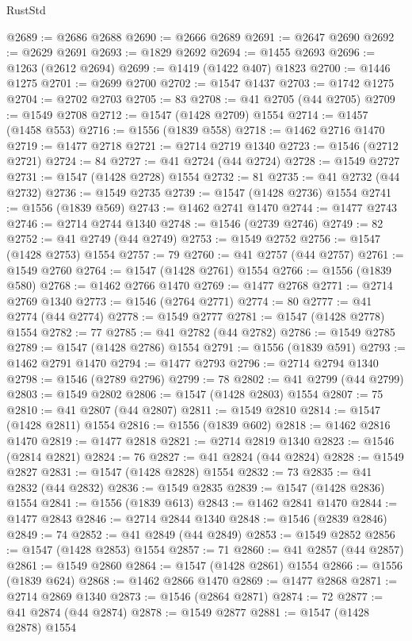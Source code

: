 \begin{lexlean}{RustStd}
\begin{coremodule}
{\begin{coremodule}
{{{{{{{{{{{{{{{{{{{{{{{{{{{{{{@2689 := @2686 @2688
@2690 := @2666 @2689
@2691 := @2647 @2690
@2692 := @2629 @2691
@2693 := @1829 @2692
@2694 := @1455 @2693
@2696 := @1263 (@2612 @2694)
@2699 := @1419 (@1422 @407) @1823
@2700 := @1446 @1275
@2701 := @2699 @2700
@2702 := @1547 @1437
@2703 := @1742 @1275
@2704 := @2702 @2703
@2705 := 83
@2708 := @41 @2705 (@44 @2705)
@2709 := @1549 @2708
@2712 := @1547 (@1428 @2709) @1554
@2714 := @1457 (@1458 @553)
@2716 := @1556 (@1839 @558)
@2718 := @1462 @2716 @1470
@2719 := @1477 @2718
@2721 := @2714 @2719 @1340
@2723 := @1546 (@2712 @2721)
@2724 := 84
@2727 := @41 @2724 (@44 @2724)
@2728 := @1549 @2727
@2731 := @1547 (@1428 @2728) @1554
@2732 := 81
@2735 := @41 @2732 (@44 @2732)
@2736 := @1549 @2735
@2739 := @1547 (@1428 @2736) @1554
@2741 := @1556 (@1839 @569)
@2743 := @1462 @2741 @1470
@2744 := @1477 @2743
@2746 := @2714 @2744 @1340
@2748 := @1546 (@2739 @2746)
@2749 := 82
@2752 := @41 @2749 (@44 @2749)
@2753 := @1549 @2752
@2756 := @1547 (@1428 @2753) @1554
@2757 := 79
@2760 := @41 @2757 (@44 @2757)
@2761 := @1549 @2760
@2764 := @1547 (@1428 @2761) @1554
@2766 := @1556 (@1839 @580)
@2768 := @1462 @2766 @1470
@2769 := @1477 @2768
@2771 := @2714 @2769 @1340
@2773 := @1546 (@2764 @2771)
@2774 := 80
@2777 := @41 @2774 (@44 @2774)
@2778 := @1549 @2777
@2781 := @1547 (@1428 @2778) @1554
@2782 := 77
@2785 := @41 @2782 (@44 @2782)
@2786 := @1549 @2785
@2789 := @1547 (@1428 @2786) @1554
@2791 := @1556 (@1839 @591)
@2793 := @1462 @2791 @1470
@2794 := @1477 @2793
@2796 := @2714 @2794 @1340
@2798 := @1546 (@2789 @2796)
@2799 := 78
@2802 := @41 @2799 (@44 @2799)
@2803 := @1549 @2802
@2806 := @1547 (@1428 @2803) @1554
@2807 := 75
@2810 := @41 @2807 (@44 @2807)
@2811 := @1549 @2810
@2814 := @1547 (@1428 @2811) @1554
@2816 := @1556 (@1839 @602)
@2818 := @1462 @2816 @1470
@2819 := @1477 @2818
@2821 := @2714 @2819 @1340
@2823 := @1546 (@2814 @2821)
@2824 := 76
@2827 := @41 @2824 (@44 @2824)
@2828 := @1549 @2827
@2831 := @1547 (@1428 @2828) @1554
@2832 := 73
@2835 := @41 @2832 (@44 @2832)
@2836 := @1549 @2835
@2839 := @1547 (@1428 @2836) @1554
@2841 := @1556 (@1839 @613)
@2843 := @1462 @2841 @1470
@2844 := @1477 @2843
@2846 := @2714 @2844 @1340
@2848 := @1546 (@2839 @2846)
@2849 := 74
@2852 := @41 @2849 (@44 @2849)
@2853 := @1549 @2852
@2856 := @1547 (@1428 @2853) @1554
@2857 := 71
@2860 := @41 @2857 (@44 @2857)
@2861 := @1549 @2860
@2864 := @1547 (@1428 @2861) @1554
@2866 := @1556 (@1839 @624)
@2868 := @1462 @2866 @1470
@2869 := @1477 @2868
@2871 := @2714 @2869 @1340
@2873 := @1546 (@2864 @2871)
@2874 := 72
@2877 := @41 @2874 (@44 @2874)
@2878 := @1549 @2877
@2881 := @1547 (@1428 @2878) @1554
}}}}}}}}}}}}}}}}}}}}}}}}}}}}}}
\end{coremodule}}
\end{coremodule}
\end{lexlean}

